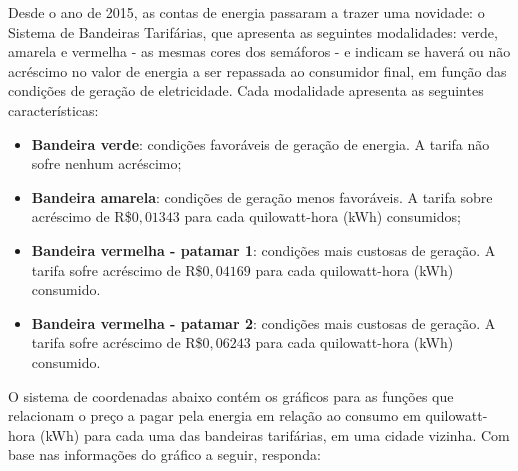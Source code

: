 \documentclass[10 pt,usenames,dvipsnames, oneside]{article}
\begin{document}
Desde o ano de 2015, as contas de energia passaram a trazer uma novidade: o Sistema de Bandeiras Tarifárias, que apresenta as seguintes modalidades: verde, amarela e vermelha - as mesmas cores dos semáforos - e indicam se haverá ou não acréscimo no valor de energia a ser repassada ao consumidor final, em função das condições de geração de eletricidade. Cada modalidade apresenta as seguintes características:

\begin{itemize}
\item \textbf{Bandeira verde}: condições favoráveis de geração de energia. A tarifa não sofre nenhum acréscimo;

\item \textbf{Bandeira amarela}: condições de geração menos favoráveis. A tarifa sobre acréscimo de R\$$0{,}01343$ para cada quilowatt-hora (kWh) consumidos;

\item \textbf{Bandeira vermelha - patamar 1}: condições mais custosas de geração. A tarifa sofre acréscimo de R\$$0{,}04169$ para cada quilowatt-hora (kWh) consumido.

\item \textbf{Bandeira vermelha - patamar 2}: condições mais custosas de geração. A tarifa sofre acréscimo de R\$$0{,}06243$ para cada quilowatt-hora (kWh) consumido.
\end{itemize}


\justify
O sistema de coordenadas abaixo contém os gráficos para as funções que relacionam o preço a pagar pela energia em relação ao consumo em quilowatt-hora (kWh) para cada uma das bandeiras tarifárias, em uma cidade vizinha. Com base nas informações do gráfico a seguir, responda:
\end{document}
